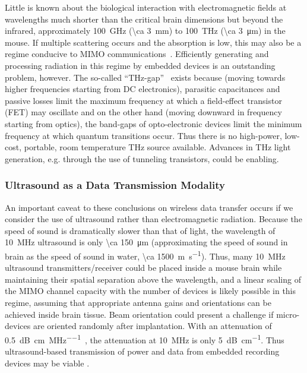 Little is known about the biological interaction with electromagnetic fields at wavelengths much shorter than the critical brain dimensions but beyond the infrared, approximately \SI{100}{\giga\hertz} (\SI{\ca 3}{\milli\meter}) to \SI{100}{\tera\hertz} (\SI{\ca 3}{\micro\meter}) in the mouse.
If multiple scattering occurs and the absorption is low, this may also be a regime conducive to MIMO communications~\cite{bakopoulos09}.
Efficiently generating and processing radiation in this regime by embedded devices is an outstanding problem, however.
The so-called ``THz-gap''~\cite{tonouchi07} exists because (moving towards higher frequencies starting from DC electronics), parasitic capacitances and passive losses limit the maximum frequency at which a field-effect transistor (FET) may oscillate and on the other hand (moving downward in frequency starting from optics), the band-gaps of opto-electronic devices limit the minimum frequency at which quantum transitions occur.
Thus there is no high-power, low-cost, portable, room temperature \si{THz} source available.
Advances in \si{THz} light generation, e.g. through the use of tunneling transistors, could be enabling.

\subsubsection{Ultrasound as a Data Transmission Modality}
An important caveat to these conclusions on wireless data transfer occurs if we consider the use of ultrasound rather than electromagnetic radiation.
Because the speed of sound is dramatically slower than that of light, the wavelength of \SI{10}{\mega\hertz} ultrasound is only \SI{\ca 150}{\micro\meter} (approximating the speed of sound in brain as the speed of sound in water, \SI{\ca 1500}{\meter\per\second}).
Thus, many \SI{10}{\mega\hertz} ultrasound transmitters/receiver could be placed inside a mouse brain while maintaining their spatial separation above the wavelength, and a linear scaling of the MIMO channel capacity with the number of devices is likely possible in this regime, assuming that appropriate antenna gains and orientations can be achieved inside brain tissue. Beam orientation could present a challenge if micro-devices are oriented randomly after implantation.
With an attenuation of \SI{0.5}{\dB\per\centi\meter\per\mega\hertz}~\cite{hoskins10}, the attenuation at \SI{10}{\mega\hertz} is only \SI{5}{\dB\per\centi\meter}.
Thus ultrasound-based transmission of power and data from embedded recording devices may be viable \cite{Seo2013}.

